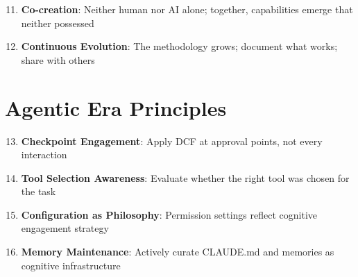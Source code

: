 \begin{enumerate}
    \setcounter{enumi}{10}
    \item \textbf{Co-creation}: Neither human nor AI alone; together, capabilities emerge that neither possessed
    \item \textbf{Continuous Evolution}: The methodology grows; document what works; share with others
\end{enumerate}

\section{Agentic Era Principles}

\begin{enumerate}
    \setcounter{enumi}{12}
    \item \textbf{Checkpoint Engagement}: Apply DCF at approval points, not every interaction
    \item \textbf{Tool Selection Awareness}: Evaluate whether the right tool was chosen for the task
    \item \textbf{Configuration as Philosophy}: Permission settings reflect cognitive engagement strategy
    \item \textbf{Memory Maintenance}: Actively curate CLAUDE.md and memories as cognitive infrastructure
\end{enumerate}

